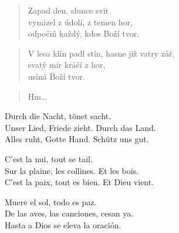 \begin{song}{}
\begin{verse}
   Zapad den, slunce svit \\
   vymizel z údolí, z temen hor, \\
   odpočiň každý, kdos Boží tvor.
\end{verse}
\begin{verse}
   V lesa klín padl stín, hasne již vatry zář, \\
   svatý mír kráčí z hor, \\
   usíná Boží tvor.
\end{verse}
\begin{verse}
   Hm\ldots{}
\end{verse}
\begin{deco}
   Durch die Nacht, tönet sacht.  \\
   Unser Lied, Friede zieht. Durch das Land. \\
   Alles ruht, Gotte Hand. Schütz uns gut. 
\end{deco}
\begin{deco}
   C'est la nui, tout se tail.  \\
   Sur la plaine, les collines. Et les bois. \\
   C'est la paix, tout es bien. Et Dieu vient. 
\end{deco}
  \begin{deco}
    Muere el sol, todo es paz. \\
    De las aves, las canciones, cesan ya.  \\
    Hasta a Dios se eleva la oración.
  \end{deco}
\end{song}
\pagebreak
